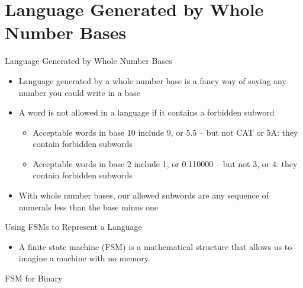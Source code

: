 \documentclass{beamer}
\begin{document}
          \section{Language Generated by Whole Number Bases}
          \begin{frame}{Language Generated by Whole Number Bases}
            \begin{itemize}
              \item Language generated by a whole number base is a fancy way of saying any number you could write in a base
              \item A word is not allowed in a language if it contains a forbidden subword
              \begin{itemize}
                \item Acceptable words in base 10 include 9, or 5.5 -- but not CAT or 5A: they contain forbidden subwords
                \item Acceptable words in base 2 include 1, or 0.110000 -- but not 3, or 4: they contain forbidden subwords
              \end{itemize}
              \item With whole number bases, our allowed subwords are any sequence of numerals less than the base minus one
            \end{itemize}
          \end{frame}



          \begin{frame}{Using FSMs to Represent a Language}
            \begin{itemize}
              \item A finite state machine (FSM) is a mathematical structure that allows us to imagine a machine with no memory.
            \end{itemize}
          \end{frame}



          \begin{frame}{FSM for Binary}
            \begin{center}
            \end{center}
          \end{frame}
\end{document}
